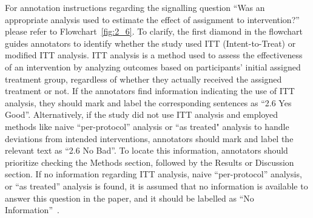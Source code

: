 \documentclass[sn-mathphys,Numbered]{sn-jnl}%
\begin{document}
For annotation instructions regarding the signalling question ``Was an appropriate analysis used to estimate the effect of assignment to intervention?'' please refer to Flowchart~\ref{fig:2_6}.
To clarify, the first diamond in the flowchart guides annotators to identify whether the study used ITT (Intent-to-Treat) or modified ITT analysis.
ITT analysis is a method used to assess the effectiveness of an intervention by analyzing outcomes based on participants' initial assigned treatment group, regardless of whether they actually received the assigned treatment or not.
If the annotators find information indicating the use of ITT analysis, they should mark and label the corresponding sentences as ``2.6 Yes Good''.
Alternatively, if the study did not use ITT analysis and employed methods like naive ``per-protocol'' analysis or ``as treated" analysis to handle deviations from intended interventions, annotators should mark and label the relevant text as ``2.6 No Bad''.
To locate this information, annotators should prioritize checking the Methods section, followed by the Results or Discussion section.
If no information regarding ITT analysis, naive ``per-protocol'' analysis, or ``as treated'' analysis is found, it is assumed that no information is available to answer this question in the paper, and it should be labelled as ``No Information''~\cite{gupta2011intention}.
%
%
%
\end{document}
